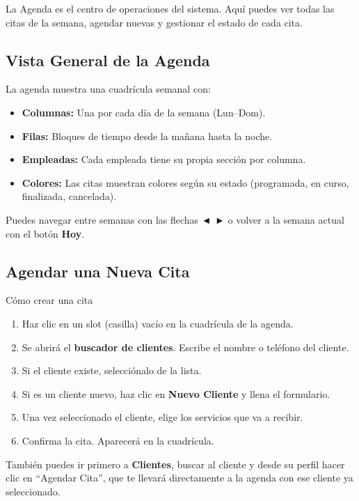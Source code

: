 \documentclass[12pt,a4paper]{article}
\begin{document}
La Agenda es el centro de operaciones del sistema. Aquí puedes ver todas las citas de la semana, agendar nuevas y gestionar el estado de cada cita.

\subsection{Vista General de la Agenda}

La agenda muestra una cuadrícula semanal con:
\begin{itemize}[leftmargin=*]
  \item \textbf{Columnas:} Una por cada día de la semana (Lun--Dom).
  \item \textbf{Filas:} Bloques de tiempo desde la mañana hasta la noche.
  \item \textbf{Empleadas:} Cada empleada tiene su propia sección por columna.
  \item \textbf{Colores:} Las citas muestran colores según su estado (programada, en curso, finalizada, cancelada).
\end{itemize}

Puedes navegar entre semanas con las flechas \textbf{◄ ►} o volver a la semana actual con el botón \textbf{Hoy}.

\subsection{Agendar una Nueva Cita}

\begin{pasobox}{Cómo crear una cita}
\begin{enumerate}[leftmargin=*]
  \item Haz clic en un slot (casilla) vacío en la cuadrícula de la agenda.
  \item Se abrirá el \textbf{buscador de clientes}. Escribe el nombre o teléfono del cliente.
  \item Si el cliente existe, selecciónalo de la lista.
  \item Si es un cliente nuevo, haz clic en \textbf{Nuevo Cliente} y llena el formulario.
  \item Una vez seleccionado el cliente, elige los servicios que va a recibir.
  \item Confirma la cita. Aparecerá en la cuadrícula.
\end{enumerate}
\end{pasobox}

\begin{notabox}
También puedes ir primero a \textbf{Clientes}, buscar al cliente y desde su perfil hacer clic en ``Agendar Cita'', que te llevará directamente a la agenda con ese cliente ya seleccionado.
\end{notabox}
\end{document}
